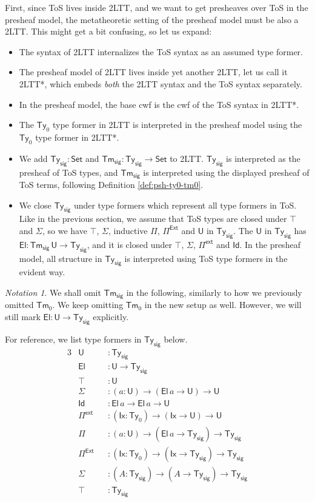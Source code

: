 \documentclass[12pt,a4paper,twoside,openany]{book}
\theoremstyle{remark}
\newtheorem{notation}{Notation}
\theoremstyle{definition}
\theoremstyle{theorem}
\newcommand{\ms}[1]{\mathsf{#1}}
\newcommand{\Tys}{\ms{Ty_{sig}}}
\newcommand{\Tms}{\ms{Tm_{sig}}}
\newcommand{\Tm}{\mathsf{Tm}}
\newcommand{\Ty}{\mathsf{Ty}}
\newcommand{\U}{\mathsf{U}}
\newcommand{\El}{\mathsf{El}}
\newcommand{\Id}{\mathsf{Id}}
\newcommand{\Set}{\mathsf{Set}}
\newcommand{\Pie}{\Pi^{\mathsf{Ext}}}
\newcommand{\Piinf}{\Pi^{\mathsf{ext}}}
\begin{document}
First, since ToS lives inside 2LTT, and we want to get presheaves over ToS in
the presheaf model, the metatheoretic setting of the presheaf model must be also
a 2LTT. This might get a bit confusing, so let us expand:
\begin{itemize}
 \item The syntax of 2LTT internalizes the ToS syntax as an assumed type former.
 \item The presheaf model of 2LTT lives inside yet another 2LTT, let us call it 2LTT*,
       which embeds \emph{both} the 2LTT syntax and the ToS syntax separately.
 \item In the presheaf model, the base cwf is the cwf of the ToS syntax in 2LTT*.
 \item The $\Ty_0$ type former in 2LTT is interpreted in the presheaf model using the $\Ty_0$ type former
       in 2LTT*.
 \item We add $\Tys : \Set$ and $\Tms : \Tys \to \Set$ to 2LTT. $\Tys$ is
   interpreted as the presheaf of ToS types, and $\Tms$ is interpreted using the
   displayed presheaf of ToS terms, following Definition \ref{def:psh-ty0-tm0}.
 \item
   We close $\Tys$ under type formers which represent all type formers in ToS.
   Like in the previous section, we assume that ToS types are closed under
   $\top$ and $\Sigma$, so we have $\top$, $\Sigma$, inductive $\Pi$, $\Pie$ and
   $\U$ in $\Tys$.  The $\U$ in $\Tys$ has $\El : \Tms\,\U \to \Tys$, and it is
   closed under $\top$, $\Sigma$, $\Piinf$ and $\Id$. In the presheaf model, all
   structure in $\Tys$ is interpreted using ToS type formers in the evident way.
\end{itemize}

\begin{notation}
We shall omit $\Tms$ in the following, similarly to how we previously omitted
$\Tm_0$. We keep omitting $\Tm_0$ in the new setup as well. However, we
will still mark $\El : \U \to \Tys$ explicitly.
\end{notation}

For reference, we list type formers in $\Tys$ below.
\begingroup
\allowdisplaybreaks
\begin{alignat*}{3}
  & \U               &&: \Tys\\
  & \El              &&: \U \to \Tys\\
  & \top             &&: \U \\
  & \Sigma           &&: (a : \U) \to (\El\,a \to \U) \to \U \\
  & \Id              &&: \El\,a \to \El\,a \to \U \\
  & \Piinf           &&: (\ms{Ix} : \Ty_0) \to (\ms{Ix} \to \U) \to \U\\
  & \Pi              &&: (a : \U) \to (\El\,a \to \Tys) \to \Tys\\
  & \Pie             &&: (\ms{Ix} : \Ty_0) \to (\ms{Ix} \to \Tys) \to \Tys\\
  & \Sigma           &&: (A : \Tys) \to (A \to \Tys) \to \Tys\\
  & \top             &&: \Tys
\end{alignat*}
\endgroup
\end{document}
